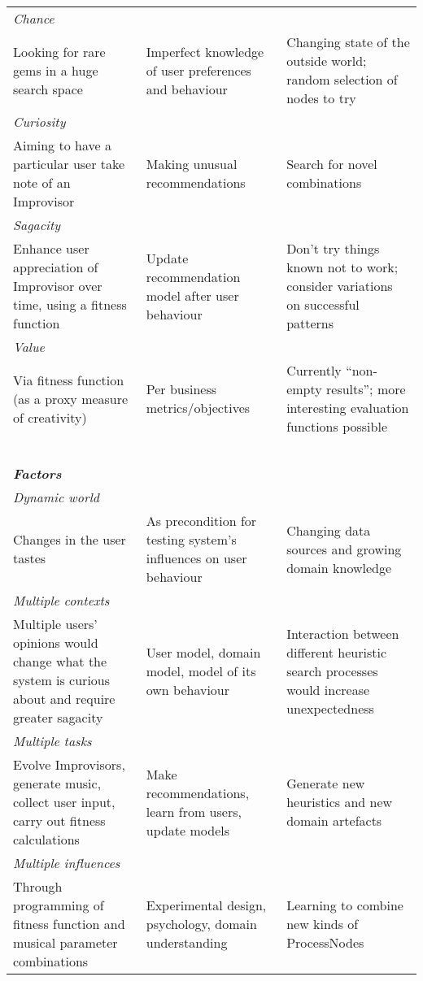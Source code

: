 \begin{table}[p]
{\begin{tabular}{p{1.5in}@{\hspace{.1in}}p{1.5in}@{\hspace{.1in}}p{1.5in}}
\multicolumn{3}{l}{\em Chance} \\[-.1cm]
Looking for rare gems in a huge search space
& Imperfect knowledge of user preferences and behaviour
& Changing state of the outside world; random selection of nodes to try \\
\multicolumn{3}{l}{\em Curiosity} \\[-.1cm]
Aiming to have a particular user take note of an Improvisor
& Making unusual recommendations
& Search for novel combinations \\
\multicolumn{3}{l}{\em Sagacity} \\[-.1cm]
Enhance user appreciation of Improvisor over time,
using a fitness function
& Update recommendation model after user behaviour 
& Don't try things known not to work; consider variations on successful patterns \\
\multicolumn{3}{l}{\em Value} \\[-.1cm]
Via fitness function (as a proxy measure of creativity)
& Per business metrics/objectives
& Currently ``non-empty results''; more interesting evaluation functions possible \\
\cline{1-3}
~\\[-.1cm]
\multicolumn{3}{l}{\em \textbf{Factors}} \\
\cline{1-3}
\multicolumn{3}{l}{\em Dynamic world} \\[-.1cm]
Changes in the user tastes
& As precondition for testing system's influences on user behaviour
& Changing data sources and growing domain knowledge \\
\multicolumn{3}{l}{\em Multiple contexts} \\[-.1cm]
Multiple users' opinions would change what the system is curious about and require greater sagacity
& User model, domain model, model of its own behaviour
& Interaction between different heuristic search processes would increase unexpectedness \\
\multicolumn{3}{l}{\em Multiple tasks} \\[-.1cm]
Evolve Improvisors, generate music, collect user input, carry out fitness calculations
& Make recommendations, learn from users, update models
& Generate new heuristics and new domain artefacts \\
\multicolumn{3}{l}{\em Multiple influences} \\[-.1cm]
Through programming of fitness function and musical parameter combinations
& Experimental design, psychology, domain understanding
& Learning to combine new kinds of ProcessNodes\\
\cline{1-3}
\end{tabular}
\par}
\normalsize
\bigskip


\end{table}
